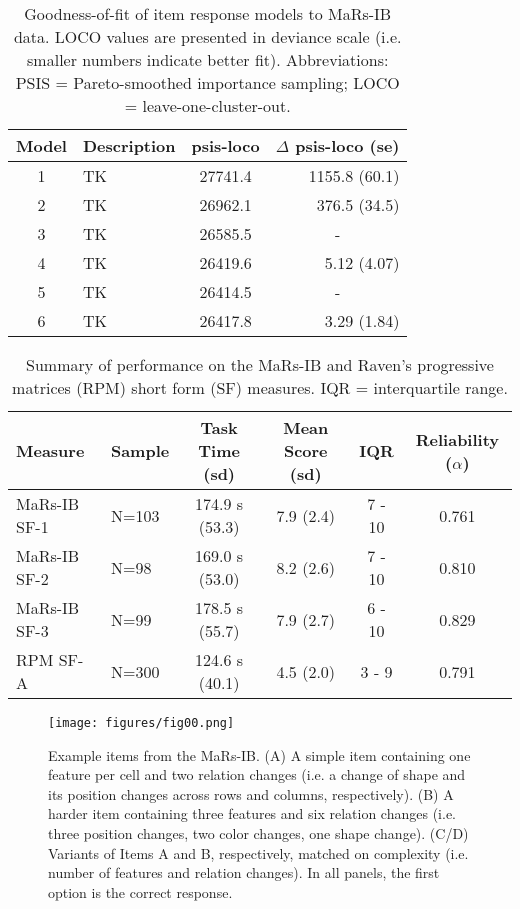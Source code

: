 \documentclass[a4paper,man,natbib]{apa6}
\begin{document}
\begin{table}
    \centering
    \begin{tabular*}{\textwidth}{clcr}
    \toprule
    Model & Description & psis-loco & $\Delta$ psis-loco (se) \\
    \midrule
    1 & TK  & 27741.4 & 1155.8 (60.1) \\
    2 & TK  & 26962.1 & 376.5 (34.5) \\
    3 & TK & 26585.5 & \multicolumn{1}{c}{-} \\
    \midrule
    4 & TK & 26419.6 & 5.12 (4.07) \\
    5 & TK & 26414.5 & \multicolumn{1}{c}{-} \\
    6 & TK & 26417.8 & 3.29 (1.84) \\
    \bottomrule
    \end{tabular*}
    \caption{\label{tab:2}\normalfont Goodness-of-fit of item response models to MaRs-IB data. LOCO values are presented in deviance scale (i.e. smaller numbers indicate better fit). Abbreviations: PSIS = Pareto-smoothed importance sampling; LOCO = leave-one-cluster-out.}
    \label{table:2}
\end{table}

\begin{table}
    \centering
    \begin{tabular*}{\textwidth}{llcccc}
    \toprule
    Measure & Sample & Task Time (sd) & Mean Score (sd) & IQR & Reliability ($\alpha$) \\
    \midrule
    MaRs-IB SF-1 & N=103 & 174.9 s (53.3) & 7.9 (2.4) & 7 - 10 & 0.761 \\
    MaRs-IB SF-2 & N=98  & 169.0 s (53.0) & 8.2 (2.6) & 7 - 10 & 0.810 \\
    MaRs-IB SF-3 & N=99  & 178.5 s (55.7) & 7.9 (2.7) & 6 - 10 & 0.829 \\
    RPM SF-A     & N=300 & 124.6 s (40.1) & 4.5 (2.0) & 3 - 9 & 0.791 \\
    \bottomrule
    \end{tabular*}
    \caption{\label{table:3}\normalfont Summary of performance on the MaRs-IB and Raven's progressive matrices (RPM) short form (SF) measures. IQR = interquartile range.}
\end{table}


\begin{figure}
\centering
\texttt{[image: figures/fig00.png]}
\caption{\label{fig:fig00} Example items from the MaRs-IB. (A) A simple item containing one feature per cell and two relation changes (i.e. a change of shape and its position changes across rows and columns, respectively). (B) A harder item containing three features and six relation changes (i.e. three position changes, two color changes, one shape change). (C/D) Variants of Items A and B, respectively, matched on complexity (i.e. number of features and relation changes).  In all panels, the first option is the correct response.}
\end{figure}
\end{document}
